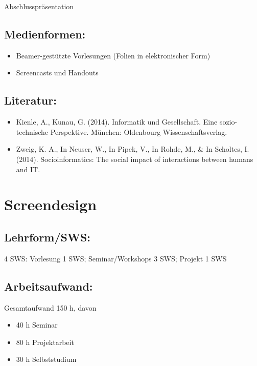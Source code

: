 Abschlusspräsentation

\section*{Medienformen:}\label{medienformen-13}

\begin{itemize}
\item
  Beamer-gestützte Vorlesungen (Folien in elektronischer Form)
\item
  Screencasts und Handouts
\end{itemize}

\section*{Literatur:}\label{literatur-20}

\begin{itemize}
\item
  Kienle, A., Kunau, G. (2014). Informatik und Gesellschaft. Eine
  sozio-technische Perspektive. München: Oldenbourg Wissenschaftsverlag.
\item
  Zweig, K. A., In Neuser, W., In Pipek, V., In Rohde, M., \& In
  Scholtes, I. (2014). Socioinformatics: The social impact of
  interactions between humans and IT.
\end{itemize}

\chapter{Screendesign}\label{screendesign}

\section*{Lehrform/SWS:}\label{lehrformsws-21}

4 SWS: Vorlesung 1 SWS; Seminar/Workshops 3 SWS; Projekt 1 SWS

\section*{Arbeitsaufwand:}\label{arbeitsaufwand-17}

Gesamtaufwand 150 h, davon

\begin{itemize}
\item
  40 h Seminar
\item
  80 h Projektarbeit
\item
  30 h Selbststudium
\end{itemize}


